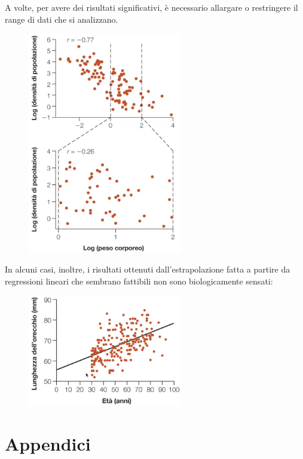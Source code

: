 \documentclass[10pt, draft]{book}
\begin{document}
A volte, per avere dei risultati significativi, è necessario allargare o restringere il range di dati che si analizzano.
\begin{figure}[H]
    \centering
    \includegraphics[width=0.6\textwidth]{figrange}
    \caption{\small{}}
    \label{figrange}
\end{figure}

In alcuni casi, inoltre, i risultati ottenuti dall'estrapolazione fatta a partire da regressioni lineari che sembrano fattibili non sono biologicamente sensati:
\begin{figure}[H]
    \centering
    \includegraphics[width=0.6\textwidth]{fig17.2-2}
    \caption{\small{}}
    \label{fig17.2-2}
\end{figure}

\chapter{Appendici}
\end{document}
